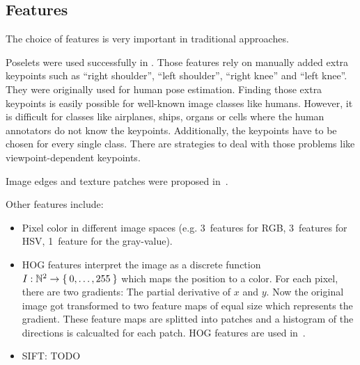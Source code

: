 
\subsection{Features}\label{subsec:features}%
The choice of features is very important in traditional approaches.

Poselets were used successfully in \cite{bourdev2010detecting,brox2011object}.
Those features rely on manually added extra keypoints such as \enquote{right
shoulder}, \enquote{left shoulder}, \enquote{right knee} and \enquote{left
knee}. They were originally used for human pose estimation. Finding those extra
keypoints is easily possible for well-known image classes like humans. However,
it is difficult for classes like airplanes, ships, organs or cells where the
human annotators do not know the keypoints. Additionally, the keypoints have to
be chosen for every single class. There are strategies to deal with those
problems like viewpoint-dependent keypoints.

Image edges and texture patches were proposed in~\cite{brox2011object}.

Other features include:

\begin{itemize}
    \item Pixel color in different image spaces (e.g. 3~features for RGB,
          3~features for HSV, 1~feature for the gray-value).
    \item \Gls{HOG} features interpret the image as a discrete function
          $I: \mathbb{N}^2 \rightarrow \Set{0, \dots, 255}$ which maps the
          position to a color. For each pixel, there are two gradients: The
          partial derivative of $x$ and $y$. Now the original image got
          transformed to two feature maps of equal size which represents the
          gradient. These feature maps are splitted into patches and a
          histogram of the directions is calcualted for each patch. \gls{HOG}
          features are used in~\cite{bourdev2010detecting,felzenszwalb2010object}.
    \item SIFT: TODO
\end{itemize}
